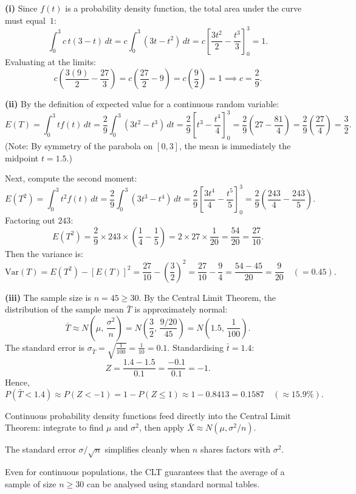 \begin{solution}
\textbf{(i)} Since $f(t)$ is a probability density function, the total area under the curve must equal~$1$:
\[
\int_0^3 c\,t(3-t)\,dt = c \int_0^3 (3t - t^2)\,dt = c \left[ \frac{3t^2}{2} - \frac{t^3}{3} \right]_0^3 = 1.
\]
Evaluating at the limits:
\[
c \left( \frac{3(9)}{2} - \frac{27}{3} \right) = c \left( \frac{27}{2} - 9 \right) = c \left( \frac{9}{2} \right) = 1 \implies \boxed{c = \frac{2}{9}}.
\]

\textbf{(ii)} By the definition of expected value for a continuous random variable:
\[
E(T) = \int_0^3 t f(t)\,dt = \frac{2}{9} \int_0^3 (3t^2 - t^3)\,dt = \frac{2}{9} \left[ t^3 - \frac{t^4}{4} \right]_0^3 = \frac{2}{9} \left( 27 - \frac{81}{4} \right) = \frac{2}{9} \left( \frac{27}{4} \right) = \boxed{\frac{3}{2}}.
\]
(Note: By symmetry of the parabola on $[0,3]$, the mean is immediately the midpoint $t = 1{.}5$.)

Next, compute the second moment:
\[
E(T^2) = \int_0^3 t^2 f(t)\,dt = \frac{2}{9} \int_0^3 (3t^3 - t^4)\,dt = \frac{2}{9} \left[ \frac{3t^4}{4} - \frac{t^5}{5} \right]_0^3 = \frac{2}{9} \left( \frac{243}{4} - \frac{243}{5} \right).
\]
Factoring out $243$:
\[
E(T^2) = \frac{2}{9} \times 243 \times \left( \frac{1}{4} - \frac{1}{5} \right) = 2 \times 27 \times \frac{1}{20} = \frac{54}{20} = \frac{27}{10}.
\]
Then the variance is:
\[
\mathrm{Var}(T) = E(T^2) - [E(T)]^2 = \frac{27}{10} - \left(\frac{3}{2}\right)^2 = \frac{27}{10} - \frac{9}{4} = \frac{54 - 45}{20} = \boxed{\frac{9}{20}} \quad (= 0{.}45).
\]

\textbf{(iii)} The sample size is $n = 45 \geq 30$. By the Central Limit Theorem, the distribution of the sample mean $\bar{T}$ is approximately normal:
\[
\bar{T} \approx N\!\left(\mu,\, \frac{\sigma^2}{n}\right) = N\!\left(\frac{3}{2},\, \frac{9/20}{45}\right) = N\!\left(1{.}5,\, \frac{1}{100}\right).
\]
The standard error is $\sigma_{\bar{T}} = \sqrt{\frac{1}{100}} = \frac{1}{10} = 0{.}1$.
Standardising $\bar{t} = 1{.}4$:
\[
Z = \frac{1{.}4 - 1{.}5}{0{.}1} = \frac{-0{.}1}{0{.}1} = -1.
\]
Hence,
\[
P(\bar{T} < 1{.}4) \approx P(Z < -1) = 1 - P(Z \leq 1) \approx 1 - 0{.}8413 = \boxed{0{.}1587} \quad (\approx 15{.}9\%).
\]
\end{solution}

\begin{takeaways}
\item Continuous probability density functions feed directly into the Central Limit Theorem: integrate to find $\mu$ and $\sigma^2$, then apply $\bar{X} \approx N(\mu, \sigma^2/n)$.
\item The standard error $\sigma / \sqrt{n}$ simplifies cleanly when $n$ shares factors with $\sigma^2$.
\item Even for continuous populations, the CLT guarantees that the average of a sample of size $n \geq 30$ can be analysed using standard normal tables.
\end{takeaways}
